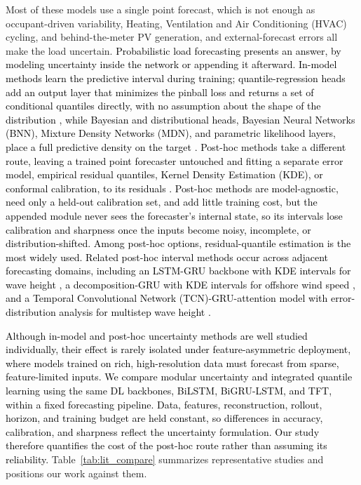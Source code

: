 \documentclass[final,10pt,1p,authoryear]{elsarticle}
\theoremstyle{definition}
\begin{document}
Most of these models use a single point forecast, which is not enough as occupant-driven variability, Heating, Ventilation and Air Conditioning (HVAC) cycling, and behind-the-meter PV generation, and external-forecast errors all make the load uncertain. \textcolor{black}{Probabilistic load forecasting presents an answer, by modeling uncertainty inside the network or appending it afterward. In-model methods learn the predictive interval during training; quantile-regression heads add an output layer that minimizes the pinball loss and returns a set of conditional quantiles directly, with no assumption about the shape of the distribution \citet{ZHANG2025303}, while Bayesian and distributional heads, Bayesian Neural Networks (BNN), Mixture Density Networks (MDN), and parametric likelihood layers, place a full predictive density on the target \citet{mahajan2024bayesian,brusaferri2022probabilistic,ozdemir2024probabilistic}. Post-hoc methods take a different route, leaving a trained point forecaster untouched and fitting a separate error model, empirical residual quantiles, Kernel Density Estimation (KDE), or conformal calibration, to its residuals \citet{khajeh2022applications,kaur2022energy,lucas2021probabilistic}. Post-hoc methods are model-agnostic, need only a held-out calibration set, and add little training cost, but the appended module never sees the forecaster's internal state, so its intervals lose calibration and sharpness once the inputs become noisy, incomplete, or distribution-shifted. Among post-hoc options, residual-quantile estimation is the most widely used. Related post-hoc interval methods occur across adjacent forecasting domains, including an LSTM-GRU backbone with KDE intervals for wave height \citet{wangying2023wave}, a decomposition-GRU with KDE intervals for offshore wind speed \citet{wang2024offshorewind}, and a Temporal Convolutional Network (TCN)-GRU-attention model with error-distribution analysis for multistep wave height \citet{wang2025waveheight}.}

\textcolor{black}{Although in-model and post-hoc uncertainty methods are well studied individually, their effect is rarely isolated under feature-asymmetric deployment, where models trained on rich, high-resolution data must forecast from sparse, feature-limited inputs. We compare modular uncertainty and integrated quantile learning using the same DL backbones, BiLSTM, BiGRU-LSTM, and TFT, within a fixed forecasting pipeline. Data, features, reconstruction, rollout, horizon, and training budget are held constant, so differences in accuracy, calibration, and sharpness reflect the uncertainty formulation. Our study therefore quantifies the cost of the post-hoc route rather than assuming its reliability.} Table~\ref{tab:lit_compare} summarizes representative studies and positions our work against them.
\end{document}
